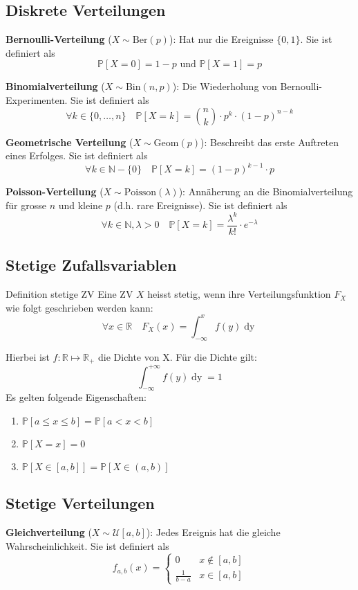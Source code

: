 \documentclass[a4paper,10pt]{article}
\def\R{\mathbb{R}}
\def\P{\mathbb{P}}
\begin{document}
\subsection{Diskrete Verteilungen}
\textbf{Bernoulli-Verteilung} (\(X \sim \text{Ber}(p)\)): Hat nur die Ereignisse \(\{0,1\}\). Sie ist definiert als
\[\P[X=0] = 1-p \text{ und } \P[X=1]=p\]

\noindent \textbf{Binomialverteilung} (\(X \sim \text{Bin}(n,p)\)): Die Wiederholung von Bernoulli-Experimenten. Sie ist definiert als
\[\forall k \in \{0, \ldots, n\} \quad \P[X=k] = \binom{n}{k} \cdot p^k \cdot (1-p)^{n-k}\]

\noindent \textbf{Geometrische Verteilung} (\(X \sim \text{Geom}(p)\)): Beschreibt das erste Auftreten eines Erfolges. Sie ist definiert als
\[\forall k \in \mathbb{N} - \{0\} \quad \P[X=k]=(1-p)^{k-1}\cdot p\]

\noindent \textbf{Poisson-Verteilung} (\(X \sim \text{Poisson}(\lambda)\)): Annäherung an die Binomialverteilung für grosse \(n\) und kleine \(p\) (d.h. rare Ereignisse). Sie ist definiert als
\[\forall k \in \mathbb{N}, \lambda > 0 \quad \P[X=k]=\frac{\lambda^k}{k!}\cdot e^{-\lambda}\]

\subsection{Stetige Zufallsvariablen}
\begin{subbox}{Definition stetige ZV}
	Eine ZV \(X\) heisst stetig, wenn ihre Verteilungsfunktion \(F_X\) wie folgt geschrieben werden kann:
	\[\forall x \in \R \quad F_X(x) = \int_{-\infty}^x f(y) \mathop{dy}\]
\end{subbox}
Hierbei ist \(f: \R \mapsto \R_+\) die Dichte von X. Für die Dichte gilt:
\[\int_{-\infty}^{+\infty}f(y) \mathop{dy} = 1\]
Es gelten folgende Eigenschaften:
\begin{enumerate}
	\item \(\P[a \le x \le b] = \P[a < x < b]\)
	\item \(\P[X=x] = 0\)
	\item \(\P[X \in [a,b]] = \P[X \in (a,b)]\)
\end{enumerate}

\subsection{Stetige Verteilungen}
\textbf{Gleichverteilung} (\(X \sim \mathcal{U}[a,b]\)): Jedes Ereignis hat die gleiche Wahrscheinlichkeit. Sie ist definiert als
\[f_{a,b}(x) = \begin{cases}
		0             & x \notin [a,b] \\
		\frac{1}{b-a} & x \in [a,b]
	\end{cases}\]
\end{document}
